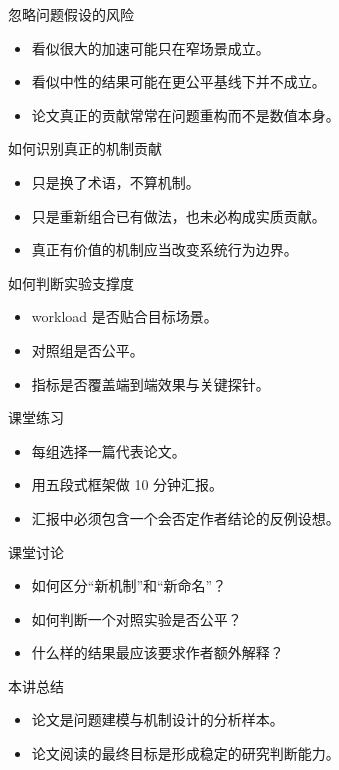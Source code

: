 \begin{frame}{忽略问题假设的风险}
  \begin{itemize}
    \item 看似很大的加速可能只在窄场景成立。
    \item 看似中性的结果可能在更公平基线下并不成立。
    \item 论文真正的贡献常常在问题重构而不是数值本身。
  \end{itemize}
\end{frame}

\begin{frame}{如何识别真正的机制贡献}
  \begin{itemize}
    \item 只是换了术语，不算机制。
    \item 只是重新组合已有做法，也未必构成实质贡献。
    \item 真正有价值的机制应当改变系统行为边界。
  \end{itemize}
\end{frame}

\begin{frame}{如何判断实验支撑度}
  \begin{itemize}
    \item workload 是否贴合目标场景。
    \item 对照组是否公平。
    \item 指标是否覆盖端到端效果与关键探针。
  \end{itemize}
\end{frame}



\begin{frame}{课堂练习}
  \begin{itemize}
    \item 每组选择一篇代表论文。
    \item 用五段式框架做 10 分钟汇报。
    \item 汇报中必须包含一个会否定作者结论的反例设想。
  \end{itemize}
\end{frame}

\begin{frame}{课堂讨论}
  \begin{itemize}
    \item 如何区分“新机制”和“新命名”？
    \item 如何判断一个对照实验是否公平？
    \item 什么样的结果最应该要求作者额外解释？
  \end{itemize}
\end{frame}

\begin{frame}{本讲总结}
  \begin{itemize}
    \item 论文是问题建模与机制设计的分析样本。
    \item 论文阅读的最终目标是形成稳定的研究判断能力。
  \end{itemize}
\end{frame}

